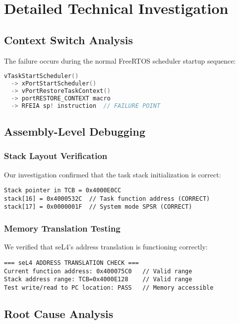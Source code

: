 \documentclass[11pt]{article}
\begin{document}
\section{Detailed Technical Investigation}

\subsection{Context Switch Analysis}

The failure occurs during the normal FreeRTOS scheduler startup sequence:
\begin{lstlisting}[language=C, caption=Normal Execution Flow]
vTaskStartScheduler() 
  -> xPortStartScheduler() 
  -> vPortRestoreTaskContext() 
  -> portRESTORE_CONTEXT macro 
  -> RFEIA sp! instruction  // FAILURE POINT
\end{lstlisting}

\subsection{Assembly-Level Debugging}

\subsubsection{Stack Layout Verification}
Our investigation confirmed that the task stack initialization is correct:

\begin{lstlisting}[caption=Stack Inspection Results]
Stack pointer in TCB = 0x4000E0CC
stack[16] = 0x4000532C  // Task function address (CORRECT)
stack[17] = 0x0000001F  // System mode SPSR (CORRECT)
\end{lstlisting}

\subsubsection{Memory Translation Testing}
We verified that seL4's address translation is functioning correctly:

\begin{lstlisting}[caption=Address Translation Verification]
=== seL4 ADDRESS TRANSLATION CHECK ===
Current function address: 0x400075C0   // Valid range
Stack address range: TCB=0x4000E128    // Valid range  
Test write/read to PC location: PASS   // Memory accessible
\end{lstlisting}

\subsection{Root Cause Analysis}
\end{document}
